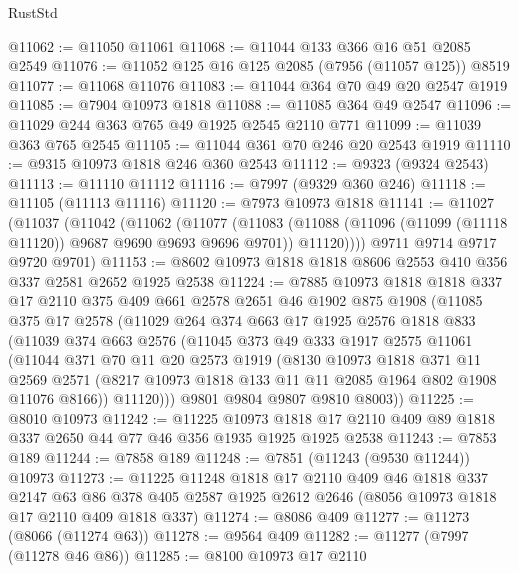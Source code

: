 \begin{lexlean}{RustStd}
\begin{coremodule}
@11062 := @11050 @11061
@11068 := @11044 @133 @366 @16 @51 @2085 @2549
@11076 := @11052 @125 @16 @125 @2085 (@7956 (@11057 @125)) @8519
@11077 := @11068 @11076
@11083 := @11044 @364 @70 @49 @20 @2547 @1919
@11085 := @7904 @10973 @1818
@11088 := @11085 @364 @49 @2547
@11096 := @11029 @244 @363 @765 @49 @1925 @2545 @2110 @771
@11099 := @11039 @363 @765 @2545
@11105 := @11044 @361 @70 @246 @20 @2543 @1919
@11110 := @9315 @10973 @1818 @246 @360 @2543
@11112 := @9323 (@9324 @2543)
@11113 := @11110 @11112
@11116 := @7997 (@9329 @360 @246)
@11118 := @11105 (@11113 @11116)
@11120 := @7973 @10973 @1818
@11141 := @11027
    (@11037
      (@11042
        (@11062
          (@11077
            (@11083
              (@11088 (@11096 (@11099 (@11118 @11120)) @9687 @9690 @9693 @9696 @9701))
              @11120))))
      @9711
      @9714
      @9717
      @9720
      @9701)
@11153 := @8602 @10973 @1818 @1818 @8606 @2553 @410 @356 @337 @2581 @2652 @1925 @2538
@11224 := @7885
    @10973
    @1818
    @1818
    @337
    @17
    @2110
    @375
    @409
    @661
    @2578
    @2651
    @46
    @1902
    @875
    @1908
    (@11085
      @375
      @17
      @2578
      (@11029
        @264
        @374
        @663
        @17
        @1925
        @2576
        @1818
        @833
        (@11039
          @374
          @663
          @2576
          (@11045
            @373
            @49
            @333
            @1917
            @2575
            @11061
            (@11044
              @371
              @70
              @11
              @20
              @2573
              @1919
              (@8130
                @10973
                @1818
                @371
                @11
                @2569
                @2571
                (@8217 @10973 @1818 @133 @11 @11 @2085 @1964 @802 @1908 @11076 @8166))
              @11120)))
        @9801
        @9804
        @9807
        @9810
        @8003))
@11225 := @8010 @10973
@11242 := @11225
    @10973
    @1818
    @17
    @2110
    @409
    @89
    @1818
    @337
    @2650
    @44
    @77
    @46
    @356
    @1935
    @1925
    @1925
    @2538
@11243 := @7853 @189
@11244 := @7858 @189
@11248 := @7851 (@11243 (@9530 @11244)) @10973
@11273 := @11225
    @11248
    @1818
    @17
    @2110
    @409
    @46
    @1818
    @337
    @2147
    @63
    @86
    @378
    @405
    @2587
    @1925
    @2612
    @2646
    (@8056 @10973 @1818 @17 @2110 @409 @1818 @337)
@11274 := @8086 @409
@11277 := @11273 (@8066 (@11274 @63))
@11278 := @9564 @409
@11282 := @11277 (@7997 (@11278 @46 @86))
@11285 := @8100 @10973 @17 @2110

\end{coremodule}
\end{lexlean}
